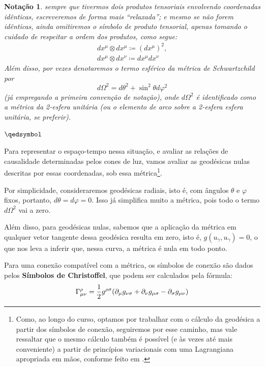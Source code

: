 \documentclass[12pt, a4paper]{article}
\theoremstyle{meuremarkstyle}
\newtheorem*{notação}{Notação}
\begin{document}
\begin{notação}
sempre que tivermos dois produtos tensoriais envolvendo coordenadas idênticas, escreveremos de forma mais
\enquote{relaxada}; e mesmo se não forem idênticas, ainda omitiremos o símbolo de produto tensorial, apenas tomando o cuidado de
respeitar a ordem dos produtos, como segue:
\begin{gather*}
  dx^{\mu} \otimes dx^{\mu} \coloneq (dx^{\mu})^2,\\
  dx^{\mu} \otimes dx^{\nu}  \coloneq dx^{\mu}dx^{\nu}
\end{gather*} 
Além disso, por vezes denotaremos o termo esférico da métrica de Schwartzchild por
\begin{equation*}
  d\Omega^2 = d\theta ^2 + \sin^2\theta d\varphi ^2
\end{equation*}
(já empregando a primeira convenção de notação), onde $d\Omega^2$ é identificado como a 
métrica da 2-esfera unitária (ou o elemento de arco sobre a 2-esfera esfera unitária, se preferir).
\begin{flushright}
 $\qedsymbol$
\end{flushright}
\end{notação}

Para representar o espaço-tempo nessa situação, e avaliar as relações de causalidade
determinadas pelos cones de luz, vamos avaliar as geodésicas nulas descritas por
essas coordenadas, sob essa métrica\footnote{Como, ao longo do curso, optamos por trabalhar
com o cálculo da geodésica a partir dos símbolos de conexão, seguiremos por esse caminho, mas
vale ressaltar que o mesmo cálculo também é possível (e às vezes até mais conveniente) a 
partir de princípios variacionais com uma Lagrangiana apropriada em mãos, conforme feito em
\cite{schuller2015}.}. 

Por simplicidade, consideraremos geodésicas radiais, isto é, com
ângulos $\theta$ e $\varphi$ fixos, portanto, $d\theta = d\varphi = 0$. Isso
já simplifica muito a métrica, pois todo o termo $d\Omega^2$ vai a zero.

Além disso, para geodésicas nulas, sabemos que a aplicação da métrica em qualquer vetor tangente dessa 
geodésica resulta em zero, isto é, $g(u_\gamma,u_\gamma) = 0$, o que nos leva a inferir que,
nessa curva, a métrica é nula em todo ponto. 

Para uma conexão compatível com a métrica, os símbolos de conexão são dados pelos \textbf{Símbolos de
Christoffel}, que podem ser calculados pela fórmula:
\begin{equation*}
  \Gamma^\rho_{\mu\nu} = \frac{1}{2}g^{\rho \sigma}\qty(\partial_\mu g_{\nu\sigma} + \partial_{\nu}g_{\mu\sigma} - \partial_{\sigma}g_{\mu\nu})
\end{equation*}
\end{document}
